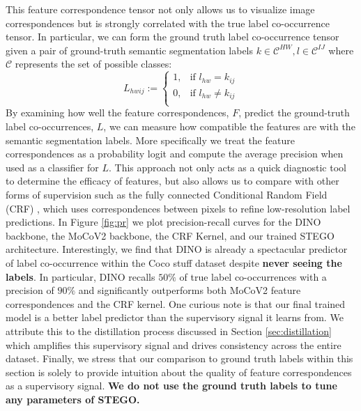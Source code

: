 \documentclass{article} \usepackage{iclr2022_conference,times}
\begin{document}
This feature correspondence tensor not only allows us to visualize image correspondences but is strongly correlated with the true label co-occurrence tensor. In particular, we can form the ground truth label co-occurrence tensor given a pair of ground-truth semantic segmentation labels $k \in \mathcal{C}^{HW}, l \in \mathcal{C}^{IJ}$ where $\mathcal{C}$ represents the set of possible classes:
$$
    L_{hwij} :=  \begin{cases} 
        1, & \text{if } l_{hw}=k_{ij}\\
        0, & \text{if } l_{hw} \neq k_{ij} \\
        \end{cases} 
$$
By examining how well the feature correspondences, $F$, predict the ground-truth label co-occurrences, $L$, we can measure how compatible the features are with the semantic segmentation labels. More specifically we treat the feature correspondences as a probability logit and compute the average precision when used as a classifier for $L$. This approach not only acts as a quick diagnostic tool to determine the efficacy of features, but also allows us to compare with other forms of supervision such as the fully connected Conditional Random Field (CRF) \citep{fullcrf}, which uses correspondences between pixels to refine low-resolution label predictions. In Figure \ref{fig:pr} we plot precision-recall curves for the DINO backbone, the MoCoV2 backbone, the CRF Kernel, and our trained STEGO architecture. Interestingly, we find that DINO is already a spectacular predictor of label co-occurrence within the Coco stuff dataset despite \textbf{never seeing the labels}. In particular, DINO recalls $50\%$ of true label co-occurrences with a precision of $90\%$ and significantly outperforms both MoCoV2 feature correspondences and the CRF kernel. One curious note is that our final trained model is a better label predictor than the supervisory signal it learns from. We attribute this to the distillation process discussed in Section \ref{sec:distillation} which amplifies this supervisory signal and drives consistency across the entire dataset. Finally, we stress that our comparison to ground truth labels within this section is solely to provide intuition about the quality of feature correspondences as a supervisory signal. \textbf{We do not use the ground truth labels to tune any parameters of STEGO.}
\end{document}
